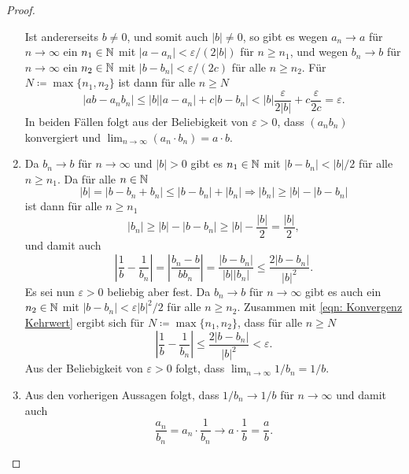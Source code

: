 \documentclass[a4paper,10pt]{article}
\begin{document}
\begin{proof}
\begin{enumerate}
\[   \]
   Ist andererseits $b \neq 0$, und somit auch $|b| \neq 0$, so gibt es wegen $a_n \to a$ für $n \to \infty$ ein $n_1 \in \mathbb{N}$ mit $|a - a_n| < \varepsilon/(2|b|)$ für $n \geq n_1$, und wegen $b_n \to b$ für $n \to \infty$ ein $n_2 \in \mathbb{N}$ mit $|b - b_n| < \varepsilon/(2c)$ für alle $n \geq n_2$. Für $N \coloneqq \max \{n_1, n_2\}$ ist dann für alle $n \geq N$
   \[
    |a b - a_n b_n|
    \leq |b| |a - a_n| + c |b - b_n|
    < |b| \frac{\varepsilon}{2|b|} + c \frac{\varepsilon}{2c}
    = \varepsilon.
   \]
   In beiden Fällen folgt aus der Beliebigkeit von $\varepsilon > 0$, dass $(a_n b_n)$ konvergiert und $\lim_{n \to \infty} (a_n \cdot b_n) = a \cdot b$.
  \item
   Da $b_n \to b$ für $n \to \infty$ und $|b| > 0$ gibt es $n_1 \in \mathbb{N}$ mit $|b - b_n| < |b|/2$ für alle $n \geq n_1$. Da für alle $n \in \mathbb{N}$
   \[
    |b| = |b - b_n + b_n| \leq |b - b_n| + |b_n| \Rightarrow |b_n| \geq |b| - |b - b_n|
   \]
   ist dann für alle $n \geq n_1$
   \[
    |b_n|
    \geq |b| - |b - b_n|
    \geq |b| - \frac{|b|}{2}
    = \frac{|b|}{2},
   \]
   und damit auch
   \begin{equation}\label{eqn: Konvergenz Kehrwert}
    \left| \frac{1}{b} - \frac{1}{b_n} \right|
    = \left| \frac{b_n - b}{b b_n} \right|
    = \frac{|b - b_n|}{|b| |b_n|}
    \leq \frac{2 |b - b_n|}{|b|^2}.
   \end{equation}
   Es sei nun $\varepsilon > 0$ beliebig aber fest. Da $b_n \to b$ für $n \to \infty$ gibt es auch ein $n_2 \in \mathbb{N}$ mit $|b - b_n| < \varepsilon|b|^2/2$ für alle $n \geq n_2$. Zusammen mit \eqref{eqn: Konvergenz Kehrwert} ergibt sich für $N \coloneqq \max \{n_1, n_2\}$, dass für alle $n \geq N$
   \[
    \left|\frac{1}{b} - \frac{1}{b_n}\right|
    \leq \frac{2 |b - b_n|}{|b|^2}
    < \varepsilon.
   \]
   Aus der Beliebigkeit von $\varepsilon > 0$ folgt, dass $\lim_{n \to \infty} 1/b_n = 1/b$.
  \item
   Aus den vorherigen Aussagen folgt, dass $1/b_n \to 1/b$ für $n \to \infty$ und damit auch
   \[
    \frac{a_n}{b_n} = a_n \cdot \frac{1}{b_n} \to a \cdot \frac{1}{b} = \frac{a}{b}.
   \]
 \end{enumerate}
\end{proof}
\end{document}
